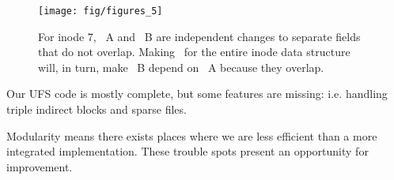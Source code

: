 \begin{figure}[htb]
  \centering
  \texttt{[image: fig/figures\_5]}
  \caption{\label{fig:overlap} For inode 7, \chdesc\ A and \chdesc\ B are
  independent changes to separate fields that do not overlap. Making \chdescs\ 
  for the entire inode data structure will, in turn, make \chdesc\ B depend
  on \chdesc\ A because they overlap.}
\end{figure}

Our UFS code is mostly complete, but some features are missing:
i.e. handling triple indirect blocks and sparse files.

Modularity means there exists places where we are less efficient
than a more integrated implementation. These trouble spots present
an opportunity for improvement.


